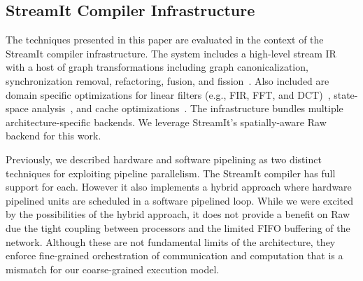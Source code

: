 



\subsection{StreamIt Compiler Infrastructure}
The techniques presented in this paper are evaluated in the context of
the StreamIt compiler infrastructure.  The system includes a
high-level stream IR with a host of graph transformations including
graph canonicalization, synchronization removal, refactoring, fusion,
and fission~\cite{streamit-asplos}.  Also included are domain specific
optimizations for linear filters (e.g., FIR, FFT, and
DCT)~\cite{lamb:pldi:2003}, state-space
analysis~\cite{agrawal:cases:2005}, and cache
optimizations~\cite{sermulins:lctes:2005}.  The infrastructure bundles
multiple architecture-specific backends.  We leverage StreamIt's
spatially-aware Raw backend for this work.

Previously, we described hardware and software pipelining as two
distinct techniques for exploiting pipeline parallelism.  The StreamIt
compiler has full support for each.  However it also implements a
hybrid approach where hardware pipelined units are scheduled in a
software pipelined loop.  While we were excited by the possibilities
of the hybrid approach, it does not provide a benefit on Raw due the
tight coupling between processors and the limited FIFO buffering of
the network. Although these are not fundamental limits of the
architecture, they enforce fine-grained orchestration of communication
and computation that is a mismatch for our coarse-grained execution
model.


